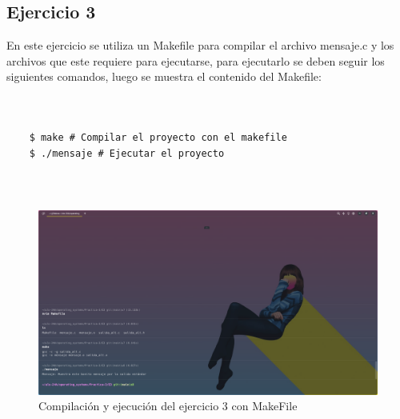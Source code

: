 \documentclass[]{article}
\newenvironment{code}{\captionsetup{type=listing}}{}
\begin{document}
\subsection{Ejercicio 3}
En este ejercicio se utiliza un Makefile para compilar el archivo mensaje.c
y los archivos que este requiere para ejecutarse, para ejecutarlo se deben 
seguir los siguientes comandos, luego se muestra el contenido del Makefile:

\begin{code}
	\inputminted{c}{../E3/salida_alt.h}
\end{code}

\begin{code}
	\inputminted{c}{../E3/salida_alt.c}
\end{code}

\begin{code}
	\inputminted{c}{../E3/mensaje.c}
\end{code}

\begin{verbatim}
	$ make # Compilar el proyecto con el makefile
	$ ./mensaje # Ejecutar el proyecto
\end{verbatim}

\begin{code}
	\label{code:c-code}
	\inputminted{Makefile}{../E3/Makefile}
\end{code}
\\	

\begin{figure}[h]
\caption{Compilación y ejecución del ejercicio 3 con MakeFile}
\centering
\includegraphics[scale=0.4,trim={0 0 20cm 20cm},clip]{e3-out.png}  
\end{figure}
\end{document}
